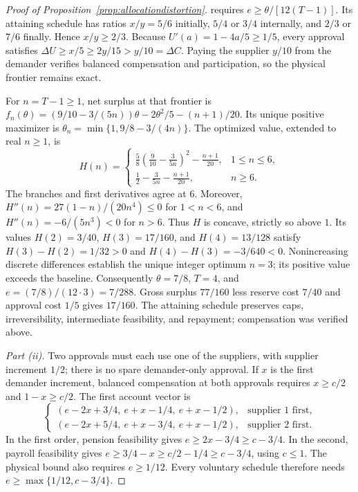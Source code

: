 \documentclass[ecta,draft,supplement]{econsocart}
\theoremstyle{definition}
\theoremstyle{definition}
\begin{document}
\begin{appendix}
\begin{proof}[Proof of Proposition~\ref{prop:allocationdistortion}]
requires $e\geq\theta/[12(T-1)]$. Its attaining schedule has
ratios $x/y=5/6$ initially, $5/4$ or $3/4$ internally, and
$2/3$ or $7/6$ finally. Hence $x/y\geq2/3$. Because
$U'(a)=1-4a/5\geq1/5$, every approval satisfies
$\Delta U\geq x/5\geq2y/15>y/10=\Delta C$.
Paying the supplier $y/10$ from the demander verifies balanced
compensation and participation, so the physical frontier remains exact.

For $n=T-1\geq1$, net surplus at that frontier is
$f_n(\theta)=(9/10-3/(5n))\theta-2\theta^2/5-(n+1)/20$.
Its unique positive maximizer is
$\theta_n=\min\{1,9/8-3/(4n)\}$. The optimized value,
extended to real $n\geq1$, is
\[
 H(n)=
 \begin{cases}
 \displaystyle\frac58\left(\frac9{10}-\frac3{5n}\right)^2
                    -\frac{n+1}{20},&1\leq n\leq6,\\[4pt]
 \displaystyle\frac12-\frac3{5n}-\frac{n+1}{20},&n\geq6.
 \end{cases}
\]
The branches and first derivatives agree at $6$.
Moreover, $H''(n)=27(1-n)/(20n^4)\leq0$ for $1<n<6$,
and $H''(n)=-6/(5n^3)<0$ for $n>6$.
Thus $H$ is concave, strictly so above $1$. Its values
$H(2)=3/40$, $H(3)=17/160$, and $H(4)=13/128$ satisfy
$H(3)-H(2)=1/32>0$ and $H(4)-H(3)=-3/640<0$.
Nonincreasing discrete differences establish the unique integer
optimum $n=3$; its positive value exceeds the baseline.
Consequently $\theta=7/8$, $T=4$, and
$e=(7/8)/(12\cdot3)=7/288$. Gross surplus $77/160$ less
reserve cost $7/40$ and approval cost $1/5$ gives $17/160$.
The attaining schedule preserves caps, irreversibility, intermediate
feasibility, and repayment; compensation was verified above.

\emph{Part (ii).}
Two approvals must each use one of the suppliers, with supplier
increment $1/2$; there is no spare demander-only approval.
If $x$ is the first demander increment, balanced compensation at
both approvals requires $x\geq c/2$ and $1-x\geq c/2$.
The first account vector is
\[
 \begin{cases}
 (e-2x+3/4,\ e+x-1/4,\ e+x-1/2),&\text{supplier 1 first},\\
 (e-2x+5/4,\ e+x-3/4,\ e+x-1/2),&\text{supplier 2 first}.
 \end{cases}
\]
In the first order, pension feasibility gives
$e\geq2x-3/4\geq c-3/4$. In the second, payroll feasibility
gives $e\geq3/4-x\geq c/2-1/4\geq c-3/4$, using
$c\leq1$. The physical bound also requires $e\geq1/12$.
Every voluntary schedule therefore needs
$e\geq\max\{1/12,c-3/4\}$.


\end{proof}
\end{appendix}
\end{document}
